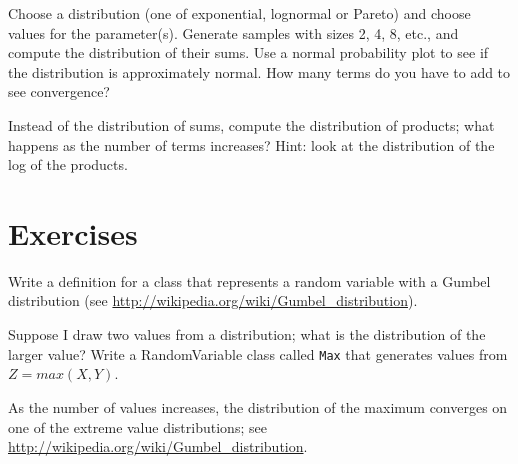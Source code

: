 \documentclass[12pt]{book}
\begin{document}
\begin{exercise}


Choose a distribution (one of exponential, lognormal or Pareto) and
choose values for the parameter(s).  Generate samples with sizes
2, 4, 8, etc., and compute the distribution of their sums.  Use
a normal probability plot to see if the distribution is approximately
normal.  How many terms do you have to add to see convergence?

\end{exercise}


\begin{exercise}

Instead of the distribution of sums, compute the distribution of
products; what happens as the number of terms increases?
Hint: look at the distribution of the log of the products.

\end{exercise}

\section{Exercises}

\begin{exercise}
Write a definition for a class that represents a random variable
with a Gumbel distribution (see \url{http://wikipedia.org/wiki/Gumbel_distribution}).

\end{exercise}


\begin{exercise}
Suppose I draw two values from a distribution; what is the distribution
of the larger value?  Write a RandomVariable class called {\tt Max}
that generates values from $Z = max(X, Y)$.

As the number of values increases, the distribution of the maximum
converges on one of the extreme value distributions; see
\url{http://wikipedia.org/wiki/Gumbel_distribution}.

\end{exercise}
\end{document}
